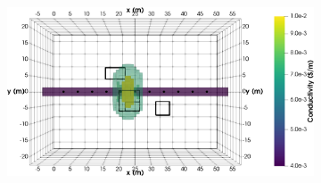 \documentclass[preprint,authoryear,12pt]{elsarticle}
\begin{document}
\begin{figure}[htp]{}
\begin{center}
\begin{subfigure}{0.55\linewidth}
      \end{subfigure}
      \hspace{-4.0cm}
      \qquad
      \begin{subfigure}{0.55\linewidth}
         \label{fig:MultiBlk_StraightTunnel_SingleLinear_South}
         \includegraphics[trim=0cm 0cm 0cm 0cm, clip=true,width=\linewidth]{./figures/Fig11b.png}
      \end{subfigure}
      \vspace{0.15cm}


\end{center}
\end{figure}
\end{document}
